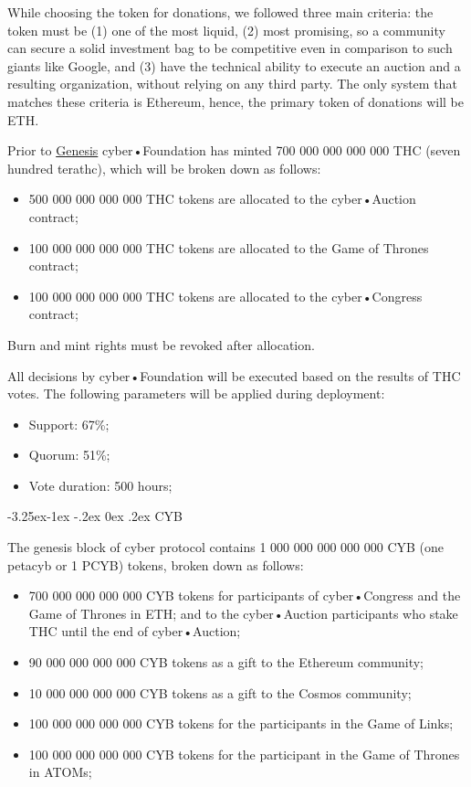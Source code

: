 \documentclass[8pt,oneside]{amsart}
\makeatletter
\renewcommand\subsection{\@startsection{subsection}{2}{\z@}%
                                     {-3.25ex\@plus -1ex \@minus -.2ex}%
                                     {0ex \@plus .2ex}%
                                     {\play\Large}}%
\newcommand{\titleSection}[1]{\subsection{#1}}
\newcommand{\code}[1]{{\PlayBold #1}}
\newenvironment{Figure}
  {\par\medskip\noindent\minipage{\linewidth}}
  {\endminipage\par\medskip}
\makeatother
\begin{document}
\begin{Abstract}
While choosing the token for donations, we followed three main criteria: the token must be (1) one of the most liquid, (2) most promising, so a community can secure a solid investment bag to be competitive even in comparison to such giants like Google, and (3) have the technical ability to execute an auction and a resulting organization, without relying on any third party. The only system that matches these criteria is Ethereum, hence, the primary token of donations will be ETH.

Prior to \hyperlink{genesis}{Genesis} cyber•Foundation has minted 700 000 000 000 000 THC (seven hundred terathc), which will be broken down as follows:

\begin{itemize}
\item 500 000 000 000 000 THC tokens are allocated to the cyber•Auction contract;
\item 100 000 000 000 000 THC tokens are allocated to the Game of Thrones contract;
\item 100 000 000 000 000 THC tokens are allocated to the cyber•Congress contract;
\end{itemize}

\begin{Figure}
 \centering
 
\end{Figure}

Burn and mint rights must be revoked after allocation.

All decisions by cyber•Foundation will be executed based on the results of THC votes. The following parameters will be applied during deployment:

\begin{itemize}
\item Support: 67\%;
\item Quorum: 51\%;
\item Vote duration: 500 hours;
\end{itemize}

\titleSection{CYB}\label{CYB}

The genesis block of \code{cyber} protocol contains 1 000 000 000 000 000 CYB (one petacyb or 1 PCYB) tokens, broken down as follows:

\begin{itemize}
\item 700 000 000 000 000 CYB tokens for participants of cyber•Congress and the Game of Thrones in ETH; and to the cyber•Auction participants who stake THC until the end of cyber•Auction;
\item 90 000 000 000 000 CYB tokens as a gift to the Ethereum community;
\item 10 000 000 000 000 CYB tokens as a gift to the Cosmos community;
\item 100 000 000 000 000 CYB tokens for the participants in the Game of Links; 
\item 100 000 000 000 000 CYB tokens for the participant in the Game of Thrones in ATOMs;


\end{itemize}
\end{Abstract}
\end{document}
